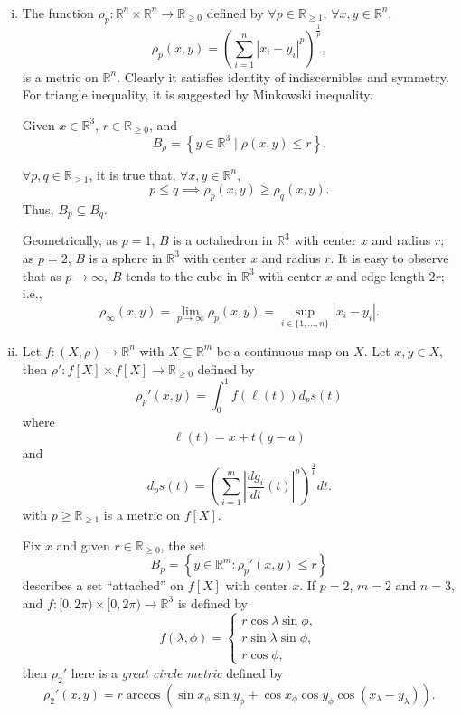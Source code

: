 \begin{example} \ 
	\begin{enumerate}[(i)]
		\item The function $\rho_p: \mathbb R^n \times \mathbb R^n \to \mathbb R_{\ge 0}$ defined by $\forall p \in \mathbb R_{\ge 1}$, $\forall x,y \in \mathbb R^n$,
			$$
			\rho_p (x,y) = \left( \sum_{i = 1}^n |x_i - y_i|^p \right)^\frac{1}{p},
			$$
			is a metric on $\mathbb R^n$. Clearly it satisfies identity of indiscernibles and symmetry. For triangle inequality, it is suggested by Minkowski inequality.
			
			Given $x \in \mathbb R^3$, $r \in \mathbb R_{\ge 0}$, and
			$$
			B_\rho = \left\{ y \in \mathbb R^3 \;|\; \rho (x,y) \le r \right\}.
			$$
			
			
			$\forall p, q \in \mathbb R_{\ge 1}$, it is true that, $\forall x,y \in \mathbb R^n$,
			$$
			p \le q \implies \rho_p(x,y) \ge \rho_{q}(x,y).
			$$
			Thus, $B_p \subseteq B_q$.
			
			Geometrically, as $p = 1$, $B$ is a octahedron in $\mathbb R^3$ with center $x$ and radius $r$; as $p = 2$, $B$ is a sphere in $\mathbb R^3$ with center $x$ and radius $r$. It is easy to observe that as $p \to \infty$, $B$ tends to the cube in $\mathbb R^3$ with center $x$ and edge length $2r$; i.e.,
			$$
			\rho_\infty(x,y) = \lim_{p \to \infty} \rho_p (x,y) = \sup_{i \in \{1, \ldots, n\}} |x_i - y_i|.
			$$
		
		
		\item Let $f: (X, \rho) \to \mathbb R^n$ with $X \subseteq \mathbb R^m$ be a continuous map on $X$. Let $x, y \in X$, then $\rho': f[X] \times f[X] \to \mathbb R_{\ge 0}$ defined by
			$$
			\rho_p'(x,y) = \int_0^1 f(\ell(t))d_ps(t)
			$$
			where
			$$
			\ell (t) = x + t(y - a)
			$$
			and
			$$
			d_p s(t) = \left( \sum_{i = 1}^m \left|\frac{dg_i}{dt}(t)\right|^p\right)^\frac{1}{p} dt.
			$$
			with $p \ge \mathbb R_{\ge 1}$ is a metric on $f[X]$.
			
			Fix $x$ and given $r \in \mathbb R_{\ge 0}$, the set
			$$
			B_p = \left\{ y \in \mathbb R^m : \rho_p'(x,y) \le r \right\}
			$$
			describes a set ``attached'' on $f[X]$ with center $x$.			
			If $p = 2$, $m = 2$ and $n = 3$, and $f: [0, 2 \pi) \times [0, 2 \pi) \to \mathbb R^3$ is defined by
			$$
			f(\lambda, \phi) = \begin{cases}
				r \cos \lambda \sin \phi, \\
				r \sin \lambda \sin \phi, \\
				r \cos \phi,
			\end{cases}
			$$
			then $\rho_2'$ here is a \textit{great circle metric} defined by
			$$
			\rho_2' (x,y) = r\arccos(\sin x_\phi \sin y_\phi + \cos x_\phi \cos y_\phi \cos(x_\lambda - y_\lambda)).
			$$
		

\end{enumerate}
\end{example}
